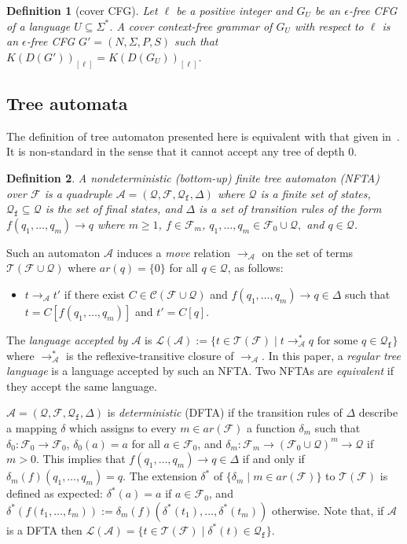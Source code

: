 \documentclass[preprint,12pt,english]{article}
\def\cA{\mathcal{A}}
\def\cC{\mathcal{C}}
\def\cF{\mathcal{F}}
\def\cL{\mathcal{L}}
\def\cT{\mathcal{T}}
\def\cQ{\mathcal{Q}}
\newtheorem{definition}{Definition}
\begin{document}
\begin{definition}[cover CFG]
Let $\ell$ be a positive integer and $G_U$ be an $\epsilon$-free CFG of a language $U\subseteq\Sigma^*$. 
A {\em cover context-free grammar} of $G_U$ with respect to $\ell$ is an $\epsilon$-free CFG $G'=(N,\Sigma,P,S)$ such that $K(D(G'))_{[\ell]}= K(D(G_U))_{[\ell]}$. 
\end{definition}

\subsection*{Tree automata}

The definition of tree automaton presented here is equivalent with that given in~\cite{Sak:1990}. It is non-standard in the sense that it cannot accept any tree of depth 0. 
\begin{definition}
A {\em  nondeterministic (bottom-up) finite tree automaton} (NFTA) over $\cF$ is a quadruple $\cA=(\cQ,\cF,\cQ_{\mathtt{f}},\Delta)$ where $\cQ$ is a finite set of {\em states}, $\cQ_{\mathtt{f}}\subseteq \cQ$ is the set of {\em final states}, and $\Delta$ is a set of {\em transition rules} of the form $f(q_1,\ldots,q_m)\to q$ where $m\geq 1$, $f\in\cF_m$, $q_1,\ldots,q_m\in\cF_0\cup\cQ,$ and $q\in\cQ$. 
\end{definition}
Such an automaton $\cA$ induces a {\em move} relation $\to_\cA$ on the set of terms $\cT(\cF\cup\cQ)$ where $ar(q)=\{0\}$ for all $q\in\cQ$, as follows: 
\begin{itemize}
\item[] $t\to_{\cA} t'$ if there exist $C\in \cC(\cF\cup\cQ)$ and $f(q_1,\ldots,q_m)\to q\in \Delta$ such that $t=C[f(q_1,\ldots,q_m)]$ and $t'=C[q].$
\end{itemize}
The {\em language accepted by $\cA$} is $\cL(\cA):=\{t\in\cT(\cF)\mid t\to^*_\cA q\text{ for some }q\in\cQ_{\mathtt{f}}\}$ where $\to^*_\cA$ is the reflexive-transitive closure of $\to_\cA$. In this paper, a {\em regular tree language} is a language accepted by such an NFTA.
Two NFTAs are {\em equivalent} if they accept the same language.

$\cA=(\cQ,\cF,\cQ_{\mathtt{f}},\Delta)$ is {\em deterministic} (DFTA) if the transition rules of $\Delta$ describe a mapping $\delta$ which assigns to every $m\in ar(\cF)$ a function $\delta_m$ such that
$\delta_0:\cF_0\to\cF_0$, $\delta_0(a)=a$ for all $a\in\cF_0$, and 
 $\delta_m:\cF_m\to (\cF_0\cup \cQ)^m\to \cQ$ if $m>0.$
This implies that $f(q_1,\ldots,q_m)\to q\in\Delta$ if and only if $\delta_m(f)(q_1,\ldots,q_m)=q.$ The  extension $\delta^*$ of $\{\delta_m\mid m\in ar(\cF)\}$ to $\cT(\cF)$ is defined as expected: $\delta^*(a)=a$ if $a\in\cF_0$, and $\delta^*(f(t_1,\ldots,t_m)):=\delta_m(f)(\delta^*(t_1),\ldots,\delta^*(t_m))$ otherwise. Note that, if $\cA$ is a DFTA then $\cL(\cA)=\{t\in\cT(\cF)\mid \delta^*(t)\in\cQ_{\mathtt{f}}\}.$
\end{document}

